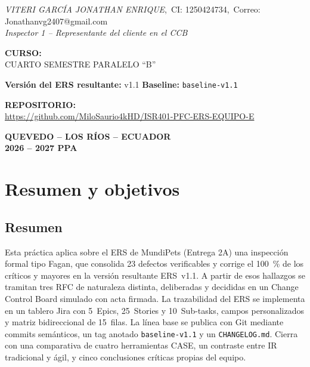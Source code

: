 \documentclass[journal,onecolumn]{IEEEtran}
\begin{document}
\begin{titlepage}
		\textit{VITERI GARCÍA JONATHAN ENRIQUE},~CI: 1250424734,~Correo: Jonathanvg2407@gmail.com\\
		\textit{Inspector 1 -- Representante del cliente en el CCB}
		
		\vspace{0.5cm}
		
		{\normalsize\bfseries CURSO:}\\[4pt]
		{\normalsize CUARTO SEMESTRE PARALELO ``B''}
		
		\vspace{0.5cm}
		
		{\normalsize\bfseries Versión del ERS resultante:} v1.1 \quad
		{\normalsize\bfseries Baseline:} \texttt{baseline-v1.1}
		
		\vspace{0.3cm}
		
		{\normalsize\bfseries REPOSITORIO:}\\
		\url{https://github.com/MiloSaurio4kHD/ISR401-PFC-ERS-EQUIPO-E}
		
		\vspace{0.8cm}
		
		{\normalsize\bfseries QUEVEDO -- LOS RÍOS -- ECUADOR}\\[4pt]
		{\normalsize\bfseries 2026 -- 2027 PPA}
		
	\end{titlepage}
	\newpage
	\section{Resumen y objetivos}
	
	\subsection{Resumen}
	
	Esta práctica aplica sobre el ERS de MundiPets (Entrega 2A) una inspección formal tipo Fagan,
	que consolida 23 defectos verificables y corrige el 100~\% de los críticos y mayores en la
	versión resultante ERS~v1.1. A partir de esos hallazgos se tramitan tres RFC de naturaleza
	distinta, deliberadas y decididas en un Change Control Board simulado con acta firmada. La
	trazabilidad del ERS se implementa en un tablero Jira con 5~Epics, 25~Stories y 10~Sub-tasks,
	campos personalizados y matriz bidireccional de 15~filas. La línea base se publica con Git
	mediante commits semánticos, un tag anotado \texttt{baseline-v1.1} y un \texttt{CHANGELOG.md}.
	Cierra con una comparativa de cuatro herramientas CASE, un contraste entre IR tradicional y
	ágil, y cinco conclusiones críticas propias del equipo.
	
\end{document}
